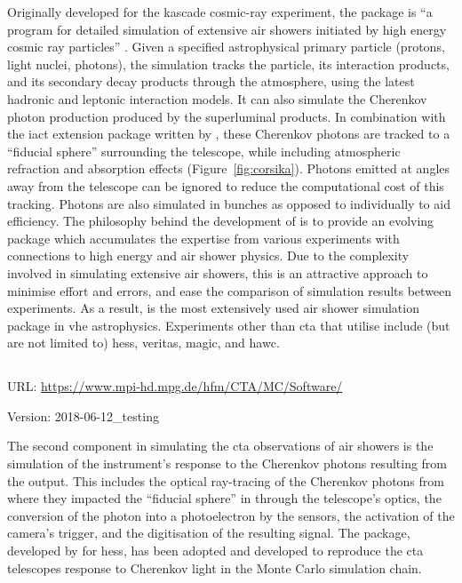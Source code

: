 \noindent Originally developed for the \gls{kascade} cosmic-ray experiment, the  package is ``a program for detailed simulation of extensive air showers initiated by high energy cosmic ray particles'' \cite[][p. i]{heck1998corsika}. Given a specified astrophysical primary particle (protons, light nuclei, photons), the simulation tracks the particle, its interaction products, and its secondary decay products through the atmosphere, using the latest hadronic and leptonic interaction models. It can also simulate the Cherenkov photon production produced by the superluminal products. In combination with the \gls{iact} extension package written by \textcite{Bernlohr2008}, these Cherenkov photons are tracked to a ``fiducial sphere'' surrounding the telescope, while including atmospheric refraction and absorption effects (Figure~\ref{fig:corsika}). Photons emitted at angles away from the telescope can be ignored to reduce the computational cost of this tracking. Photons are also simulated in bunches as opposed to individually to aid efficiency. The philosophy behind the development of  is to provide an evolving package which accumulates the expertise from various experiments with connections to high energy and air shower physics. Due to the complexity involved in simulating extensive air showers, this is an attractive approach to minimise effort and errors, and ease the comparison of simulation results between experiments. As a result,  is the most extensively used air shower simulation package in \gls{vhe} astrophysics. Experiments other than \gls{cta} that utilise  include (but are not limited to) \gls{hess}, \gls{veritas}, \gls{magic}, and \gls{hawc}.

\subsection{}
\vspace{-0.7em}
\noindent \hspace{\parindent} {\tiny URL: \url{https://www.mpi-hd.mpg.de/hfm/CTA/MC/Software/} \par}
\noindent \hspace{\parindent} {\tiny Version: 2018-06-12\_testing \par}

\noindent The second component in simulating the \gls{cta} observations of air showers is the simulation of the instrument's response to the Cherenkov photons resulting from the  output. This includes the optical ray-tracing of the Cherenkov photons from where they impacted the ``fiducial sphere'' in  through the telescope's optics, the conversion of the photon into a photoelectron by the sensors, the activation of the camera's trigger, and the digitisation of the resulting signal. The  package, developed by \textcite{Bernlohr2008} for \gls{hess}, has been adopted and developed to reproduce the \gls{cta} telescopes response to Cherenkov light in the Monte Carlo simulation chain.

